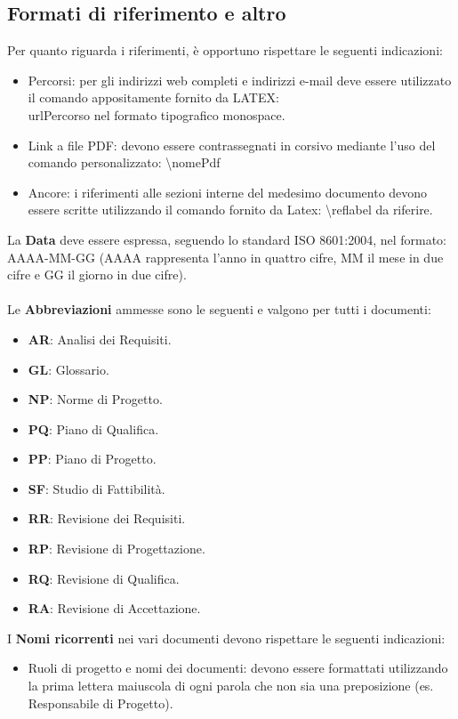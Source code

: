 {		\subsection{Formati di riferimento e altro}{
			\label{sub:rif}
			Per quanto riguarda i riferimenti, \`{e} opportuno rispettare le seguenti indicazioni:
			\begin{itemize}
				\item Percorsi: per gli indirizzi web completi e indirizzi e-mail deve essere utilizzato il comando appositamente fornito da LATEX: \\url{Percorso} nel formato tipografico monospace.
				\item Link a file PDF: devono essere contrassegnati in corsivo mediante l’uso del comando personalizzato: \textbackslash nomePdf
				\item Ancore: i riferimenti alle sezioni interne del medesimo documento devono essere scritte utilizzando il comando fornito da Latex: \textbackslash ref{label da riferire}.
			\end{itemize}
			La \textbf{Data} deve essere espressa, seguendo lo standard ISO 8601:2004, nel formato: AAAA-MM-GG (AAAA rappresenta l'anno in quattro cifre, MM il mese in due cifre e GG il giorno in due cifre).\\
			\\
			Le \textbf{Abbreviazioni} ammesse sono le seguenti e valgono per tutti i documenti:
			\begin{itemize}
				\item \textbf{AR}: Analisi dei Requisiti.
				\item \textbf{GL}: Glossario.
				\item \textbf{NP}: Norme di Progetto.
				\item \textbf{PQ}: Piano di Qualifica.
				\item \textbf{PP}: Piano di Progetto.
				\item \textbf{SF}: Studio di Fattibilit\`{a}.
				\item \textbf{RR}: Revisione dei Requisiti.
				\item \textbf{RP}: Revisione di Progettazione.
				\item \textbf{RQ}: Revisione di Qualifica.
				\item \textbf{RA}: Revisione di Accettazione.
			\end{itemize}
			I \textbf{Nomi ricorrenti} nei vari documenti devono rispettare le seguenti indicazioni:
			\begin{itemize}
				\item Ruoli di progetto e nomi dei documenti: devono essere formattati utilizzando la prima lettera maiuscola di ogni parola che non sia una preposizione (es. Responsabile di Progetto).

\end{itemize}}}

